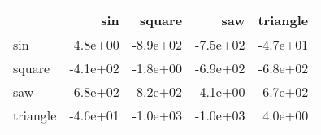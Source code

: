 \begin{tabular}{lrrrr}
\toprule
{} &      sin &   square &      saw &  triangle \\
\midrule
sin      &  4.8e+00 & -8.9e+02 & -7.5e+02 &  -4.7e+01 \\
square   & -4.1e+02 & -1.8e+00 & -6.9e+02 &  -6.8e+02 \\
saw      & -6.8e+02 & -8.2e+02 &  4.1e+00 &  -6.7e+02 \\
triangle & -4.6e+01 & -1.0e+03 & -1.0e+03 &   4.0e+00 \\
\bottomrule
\end{tabular}
